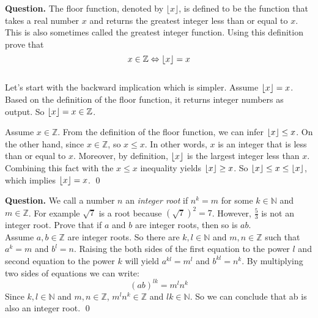 \begin{example}{}
	\textbf{Question.} The floor function, denoted by $ \lfloor x \rfloor $, is defined to be the function that takes a real number $ x $ and returns the greatest integer less than or equal to $ x $. This is also sometimes called the greatest integer function. Using this definition prove that
	\[ x \in \mathbb{Z} \Leftrightarrow \lfloor x \rfloor = x \] \\
	
	 Let's start with the backward implication which is simpler. Assume $ \lfloor x \rfloor = x $. Based on the definition of the floor function, it returns integer numbers as output. So $ \lfloor x \rfloor = x \in \mathbb{Z} $.
	
	 Assume $ x \in \mathbb{Z} $. From the definition of the floor function, we can infer $ \lfloor x \rfloor \leq x $. On the other hand, since $ x \in \mathbb{Z} $, so $ x \leq x $. In other words, $ x $ is an integer that is less than or equal to $ x $. Moreover, by definition, $ \lfloor x \rfloor $ is the largest integer less than $ x $. Combining this fact with the $ x \leq x $ inequality yields $ \lfloor x \rfloor \geq x $. So $ \lfloor x \rfloor \leq x \leq \lfloor x \rfloor $, which implies $ \lfloor x \rfloor = x $. \qed
	
\end{example}


\begin{example}{}
	\textbf{Question.} We call a number $ n $ an \emph{integer root} if $ n^k=m $ for some $ k \in \mathbb{N} $ and $ m \in \mathbb{Z} $. For example $ \sqrt{7} $ is a root because $ (\sqrt{7})^2 = 7 $. However, $ \frac{5}{3} $ is not an integer root. Prove that if $ a $ and $ b $ are integer roots, then so is $ ab $. \\
	
	 Assume $ a,b \in \mathbb{Z} $ are integer roots. So there are $ k,l \in \mathbb{N} $ and $ m,n \in \mathbb{Z} $ such that $ a^k = m $ and $ b^l=n $. Raising the both sides of the first equation to the power $ l $ and second equation to the power $ k $ will yield $ a^{kl} = m^l $ and $ b^{kl} = n^k $. By multiplying two sides of equations we can write:
	\[ (ab)^{lk} = m^l n^k \] 
	Since $ k,l \in \mathbb{N} $ and $ m,n \in \mathbb{Z} $, $ m^l n^k \in \mathbb{Z} $ and $ lk \in \mathbb{N} $. So we can conclude that ab is also an integer root. \qed
\end{example}

